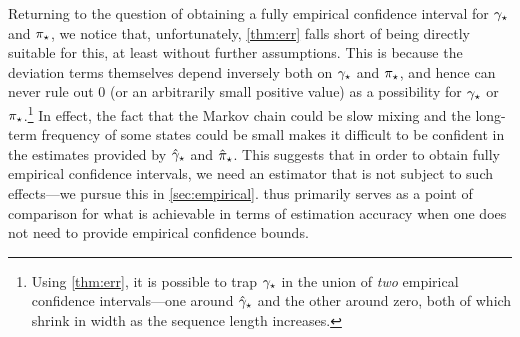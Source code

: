 Returning to the question of obtaining a fully empirical confidence 
interval for $\gamma_{\star}$ and $\pi_{\star}$, we notice that,
unfortunately, \cref{thm:err} falls short of being directly suitable for this,
at least without further assumptions.
This is because the deviation terms themselves depend inversely both
on $\gamma_{\star}$ and $\pi_{\star}$, and hence can never rule out $0$ (or an
arbitrarily small positive value) as a possibility for $\gamma_{\star}$ or
$\pi_{\star}$.\footnote{%
  Using \cref{thm:err}, it is possible to trap $\gamma_{\star}$ in the
  union of \emph{two} empirical confidence intervals---one around
  $\hat\gamma_{\star}$ and the other around zero, both of which shrink in width
  as the sequence length increases.%
}
In effect, the fact that the Markov chain could be slow mixing and the
long-term frequency of some states could be small makes it difficult
to be confident in the estimates provided by $\hat\gamma_{\star}$ and
$\hat\pi_{\star}$.
This suggests that in order to obtain fully empirical confidence
intervals, we need an estimator that is not subject to such
effects---we pursue this in \cref{sec:empirical}.
 thus primarily serves as a point of comparison
for what is achievable in terms of estimation accuracy when one does
not need to provide empirical confidence bounds.

